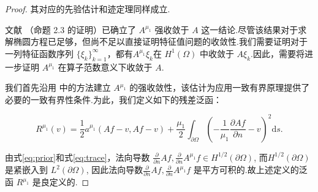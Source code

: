 \begin{proof}
其对应的先验估计和迹定理同样成立.

文献 \cite{Maury2009Numerical}（命题 2.3 的证明）已确立了 $A^{\mu_{1}}$ 强收敛于 $A$ 这一结论.尽管该结果对于求解椭圆方程已足够，但尚不足以直接证明特征值问题的收敛性.我们需要证明对于一列特征函数序列 $\{\xi_k\}_{k=1}^{\infty}$，都有$A^{\mu_1}\xi_k$在 $H^1(\Omega)$ 中收敛于 $A\xi_k$.因此，需要将进一步证明 $A^{\mu_{1}}$ 在算子范数意义下收敛于 $A$.

我们首先沿用 \cite{Maury2009Numerical} 中的方法建立 $A^{\mu_{1}}$ 的强收敛性，该估计为应用一致有界原理提供了必要的一致有界性条件.为此，我们定义如下的残差泛函：







\begin{equation}\label{eq:R_lambda}
R^{\mu_{1}}(v) = \frac{1}{2}a^{\mu_{1}}( Af-v , Af-v )+\frac{\mu_{1}}{2}\int_{\partial\Omega}\left( -\frac{1}{\mu_{1}}\frac{\partial Af}{\partial n}-v \right)^{2} \text{d}s.
\end{equation}

由式\eqref{eq:prior}和式\eqref{eq:trace}，法向导数 $\frac{\partial }{\partial n}Af, \frac{\partial }{\partial n}A^{\mu_{1}}f\in H^{1/2}(\partial \Omega)$, 而$H^{1/2}(\partial \Omega)$ 是紧嵌入到 $L^2(\partial \Omega)$, 因此法向导数$\frac{\partial }{\partial n}Af, \frac{\partial }{\partial n}A^{\mu_{1}}f$ 是平方可积的.故上述定义的泛函 $R^{\mu_{1}}$ 是良定义的.


\end{proof}
